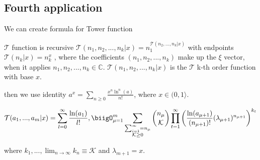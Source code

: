 \subsection{Fourth application}

We can create formula for Tower function

\begin{definition}
        \(\mathcal{T}\) function is recursive \(\mathcal{T}(n_1,
        n_2, ..., n_k | x) = n_1^{\mathcal{T}(n_2, ..., n_k | x)
        }\) with endpoints \(\mathcal{T}(n_k | x ) = n_k^x\) , 
        where the coefficients  \((n_1, n_2, ..., n_k)\) make 
        up the \(\xi\) vector,
        when it applies \(n_1, n_2, ..., n_k \in  \mathbb{C}\). 
        \(\mathcal{T}(n_1, n_2, ..., n_k | x) \) is the 
        \(\mathcal{T}\) k-th order function with base \(x\).
\end{definition}

then we use identity $a^x = \sum_{n\geq0}\frac{x^n
\ln^n(a)}{n!}$, where $x \in (0, 1\rangle$.

\begin{align}
        \mathcal{T}(a_1, ..., a_m |x)= \sum_{l=0}^\infty
        \frac{\ln(a_1)}{l!}, \biigO_{\mu=1}^{m}\sum_{
        \substack{\sum_{i=1}^\infty = n_\mu \\ \mathcal{K}
        \geq 0}}\binom{n_{\mu}}{\mathcal{K}}\prod_{t=1}^\infty
        \left(\frac{\ln(a_{\mu+1})}{(n_{\mu+1})!}(\lambda_{
        \mu+1})^{n_{\mu+1}}\right)^{k_t}
\end{align}

where $k_1, ..., \lim_{n\to \infty}k_n \equiv \mathcal{K} 
$ and $\lambda_{m+1}=x$.
